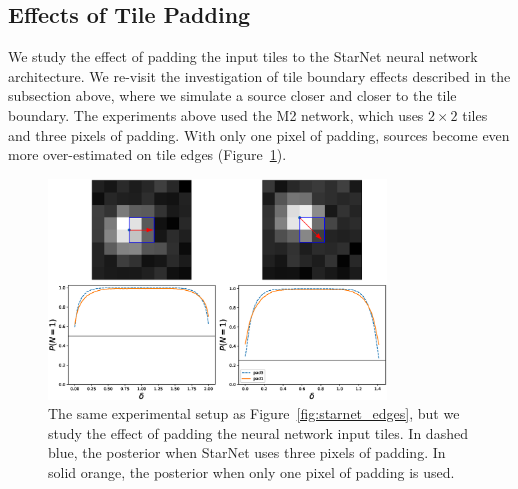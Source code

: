 \subsection{Effects of Tile Padding}
We study the effect of padding the input 
tiles to the StarNet neural network architecture. 
We re-visit the investigation of tile boundary effects 
described in the subsection above, where 
we simulate a source closer and closer to the tile boundary. 
The experiments above used the M2 network, 
which uses $2\times 2$ tiles and three pixels of padding. 
With only one pixel of padding, sources become even more 
over-estimated on tile edges (Figure~\ref{fig:starnet_edges_lesspad}). 

\begin{figure}[tb]
    \centering
    \includegraphics[width=0.8\textwidth]{./figures_vg/coverage/edges_example_lesspad.eps}
    \caption{The same experimental setup as Figure~\ref{fig:starnet_edges}, but we 
    study the effect of padding the neural network input tiles. 
    In dashed blue, the posterior when 
    StarNet uses three pixels of padding. 
    In solid orange, the posterior when only one pixel of padding is used.
    }
    \label{fig:starnet_edges_lesspad}
\end{figure}
